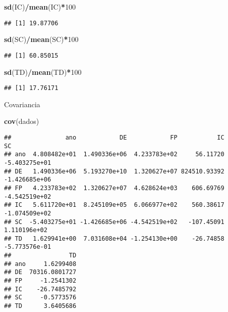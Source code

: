 \documentclass[]{article}
\newenvironment{Shaded}{\begin{snugshade}}{\end{snugshade}}
\newcommand{\DecValTok}[1]{\textcolor[rgb]{0.00,0.00,0.81}{#1}}
\newcommand{\KeywordTok}[1]{\textcolor[rgb]{0.13,0.29,0.53}{\textbf{#1}}}
\newcommand{\NormalTok}[1]{#1}
\newcommand{\OperatorTok}[1]{\textcolor[rgb]{0.81,0.36,0.00}{\textbf{#1}}}
\begin{document}
\begin{Shaded}
\begin{Highlighting}[]
\KeywordTok{sd}\NormalTok{(IC)}\OperatorTok{/}\KeywordTok{mean}\NormalTok{(IC)}\OperatorTok{*}\DecValTok{100}
\end{Highlighting}
\end{Shaded}

\begin{verbatim}
## [1] 19.87706
\end{verbatim}

\begin{Shaded}
\begin{Highlighting}[]
\KeywordTok{sd}\NormalTok{(SC)}\OperatorTok{/}\KeywordTok{mean}\NormalTok{(SC)}\OperatorTok{*}\DecValTok{100}
\end{Highlighting}
\end{Shaded}

\begin{verbatim}
## [1] 60.85015
\end{verbatim}

\begin{Shaded}
\begin{Highlighting}[]
\KeywordTok{sd}\NormalTok{(TD)}\OperatorTok{/}\KeywordTok{mean}\NormalTok{(TD)}\OperatorTok{*}\DecValTok{100}
\end{Highlighting}
\end{Shaded}

\begin{verbatim}
## [1] 17.76171
\end{verbatim}

Covariancia

\begin{Shaded}
\begin{Highlighting}[]
\KeywordTok{cov}\NormalTok{(dados)}
\end{Highlighting}
\end{Shaded}

\begin{verbatim}
##               ano            DE            FP           IC            SC
## ano  4.808482e+01  1.490336e+06  4.233783e+02     56.11720 -5.403275e+01
## DE   1.490336e+06  5.193270e+10  1.320627e+07 824510.93392 -1.426685e+06
## FP   4.233783e+02  1.320627e+07  4.628624e+03    606.69769 -4.542519e+02
## IC   5.611720e+01  8.245109e+05  6.066977e+02    560.38617 -1.074509e+02
## SC  -5.403275e+01 -1.426685e+06 -4.542519e+02   -107.45091  1.110196e+02
## TD   1.629941e+00  7.031608e+04 -1.254130e+00    -26.74858 -5.773576e-01
##                TD
## ano     1.6299408
## DE  70316.0801727
## FP     -1.2541302
## IC    -26.7485792
## SC     -0.5773576
## TD      3.6405686
\end{verbatim}
\end{document}
